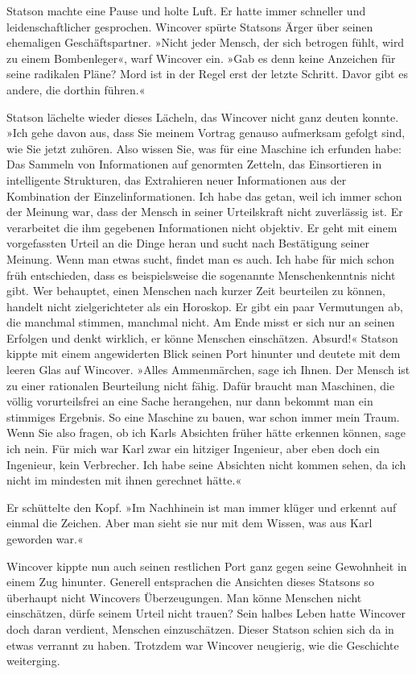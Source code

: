 Statson machte eine Pause und holte Luft. Er hatte immer schneller
und leidenschaftlicher gesprochen. Wincover spürte Statsons Ärger
über seinen ehemaligen Geschäftspartner. »Nicht jeder Mensch, der
sich betrogen fühlt, wird zu einem Bombenleger«, warf Wincover ein.
»Gab es denn keine Anzeichen für seine radikalen Pläne? Mord ist in
der Regel erst der letzte Schritt. Davor gibt es andere, die
dorthin führen.«

Statson lächelte wieder dieses Lächeln, das Wincover nicht ganz
deuten konnte. »Ich gehe davon aus, dass Sie meinem Vortrag genauso
aufmerksam gefolgt sind, wie Sie jetzt zuhören. Also wissen Sie,
was für eine Maschine ich erfunden habe: Das Sammeln von
Informationen auf genormten Zetteln, das Einsortieren in
intelligente Strukturen, das Extrahieren neuer Informationen aus
der Kombination der Einzelinformationen. Ich habe das getan, weil
ich immer schon der Meinung war, dass der Mensch in seiner
Urteilskraft nicht zuverlässig ist. Er verarbeitet die ihm
gegebenen Informationen nicht objektiv. Er geht mit einem
vorgefassten Urteil an die Dinge heran und sucht nach Bestätigung
seiner Meinung. Wenn man etwas sucht, findet man es auch. Ich habe
für mich schon früh entschieden, dass es beispielsweise die
sogenannte Menschenkenntnis nicht gibt. Wer behauptet, einen
Menschen nach kurzer Zeit beurteilen zu können, handelt nicht
zielgerichteter als ein Horoskop. Er gibt ein paar Vermutungen ab,
die manchmal stimmen, manchmal nicht. Am Ende misst er sich nur an
seinen Erfolgen und denkt wirklich, er könne Menschen einschätzen.
Absurd!« Statson kippte mit einem angewiderten Blick seinen Port
hinunter und deutete mit dem leeren Glas auf Wincover. »Alles
Ammenmärchen, sage ich Ihnen. Der Mensch ist zu einer rationalen
Beurteilung nicht fähig. Dafür braucht man Maschinen, die völlig
vorurteilsfrei an eine Sache herangehen, nur dann bekommt man ein
stimmiges Ergebnis. So eine Maschine zu bauen, war schon immer mein
Traum. Wenn Sie also fragen, ob ich Karls Absichten früher hätte
erkennen können, sage ich nein. Für mich war Karl zwar ein hitziger
Ingenieur, aber eben doch ein Ingenieur, kein Verbrecher. Ich habe
seine Absichten nicht kommen sehen, da ich nicht im mindesten mit
ihnen gerechnet hätte.«

Er schüttelte den Kopf. »Im Nachhinein ist man immer klüger und
erkennt auf einmal die Zeichen. Aber man sieht sie nur mit dem
Wissen, was aus Karl geworden war.«

Wincover kippte nun auch seinen restlichen Port ganz gegen seine
Gewohnheit in einem Zug hinunter. Generell entsprachen die
Ansichten dieses Statsons so überhaupt nicht Wincovers
Überzeugungen. Man könne Menschen nicht einschätzen, dürfe seinem
Urteil nicht trauen? Sein halbes Leben hatte Wincover doch daran
verdient, Menschen einzuschätzen. Dieser Statson schien sich da in
etwas verrannt zu haben. Trotzdem war Wincover neugierig, wie die
Geschichte weiterging.

